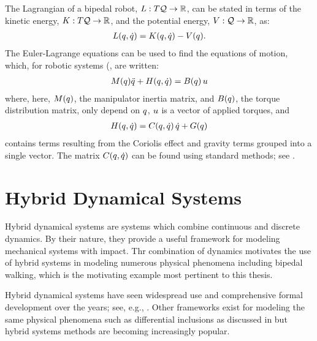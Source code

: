 The Lagrangian of a bipedal robot, $L : T\mathcal{Q} \to \mathbb{R}$, can be stated in terms of the kinetic energy, $K : T\mathcal{Q} \to \mathbb{R}$, and the potential energy, $V : \mathcal{Q} \to \mathbb{R}$, as:
%
\begin{align}
  L(q, \dot{q}) = K(q, \dot{q}) - V(q).
\end{align}
%
The Euler-Lagrange equations can be used to find the equations of motion, which, for robotic systems (\cite{Murray1994}, are written:
%
\begin{align}
  \label{eqn:eom}
  M(q)\ddot{q} + H(q, \dot{q}) = B(q) \, u
\end{align}
%
where, here, $M(q)$, the manipulator inertia matrix, and $B(q)$, the torque distribution matrix, only depend on $q$, $u$ is a vector of applied torques, and
\begin{align}
  H(q, \dot{q}) = C(q, \dot{q}) \, \dot{q} + G(q)
\end{align}
contains terms resulting from the Coriolis effect and gravity terms grouped into a single vector. The matrix $C(q, \dot{q})$ can be found using standard methods; see \cite{Murray1994}.

\section{Hybrid Dynamical Systems}

Hybrid dynamical systems are systems which combine continuous and discrete dynamics.
%
By their nature, they provide a useful framework for modeling mechanical systems with impact.
%
Thr combination of dynamics motivates the use of hybrid systems in modeling numerous physical phenomena including bipedal walking, which is the motivating example most pertinent to this thesis.
%

Hybrid dynamical systems have seen widespread use and comprehensive formal development over the years; see, e.g., \cite{Branicky1998,Goebel2009,Grizzle2014,Schaft2000,Westervelt2007}.
%
Other frameworks exist for modeling the same physical phenomena such as differential inclusions as discussed in \cite{Filippov1988} but hybrid systems methods are becoming increasingly popular.


